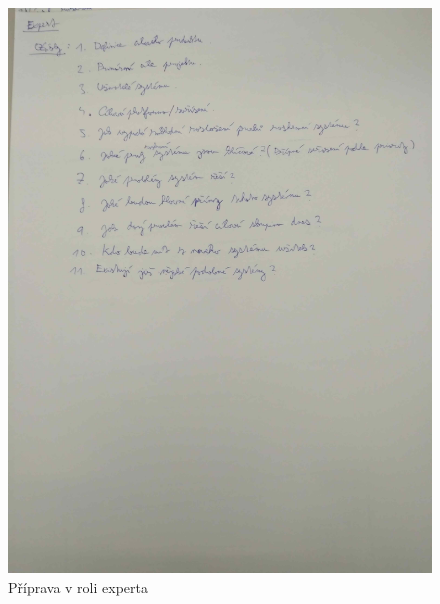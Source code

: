 \documentclass[a4paper, 11pt]{article}
\begin{document}
	\begin{figure}[ht]
		\centering
		\includegraphics[width=0.98\linewidth]{priprava_v_roli_experta.jpg}
		\caption{Příprava v roli experta}
	\end{figure}
\end{document}
